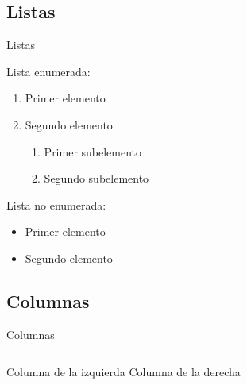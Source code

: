 \documentclass[a4paper,10pt]{beamer}
\begin{document}
\subsection{Listas}
\begin{frame}{Listas}

Lista enumerada:

\begin{enumerate}
 \item Primer elemento
 \item Segundo elemento 
 
    \begin{enumerate}
     \item Primer subelemento
     \item Segundo subelemento
    \end{enumerate}

\end{enumerate}


Lista no enumerada:
\begin{itemize}
 \item Primer elemento
 \item Segundo elemento
\end{itemize}
 
\end{frame}

\subsection{Columnas}
\begin{frame}{Columnas}
 \begin{columns}[c]
  \column{1in}
  Columna de la izquierda
  \column{1in}
  Columna de la derecha
 \end{columns}

\end{frame}
\end{document}
